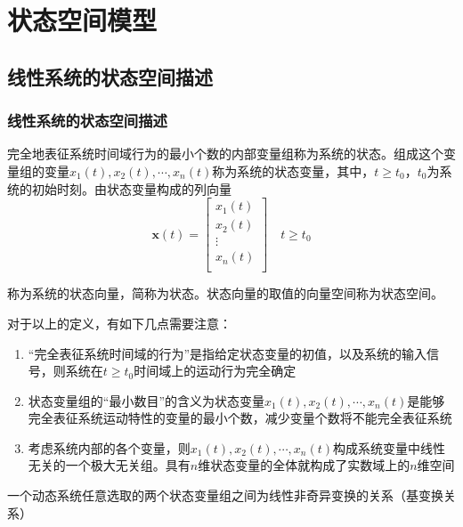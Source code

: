 \chapter{状态空间模型}

\section{线性系统的状态空间描述}

\subsection{线性系统的状态空间描述}

\begin{definition}[状态与状态空间]
    完全地表征系统时间域行为的最小个数的内部变量组称为系统的状态。组成这个变量组的变量$x_1(t),x_2(t),\cdots,x_n(t)$称为系统的状态变量，其中，$t \geq t_0$，$t_0$为系统的初始时刻。由状态变量构成的列向量
    \begin{equation*}
        \bm{x}(t) = \left[
            \begin{array}{c}
                x_1(t) \\ x_2(t) \\ \vdots \\ x_n(t)\\
            \end{array}
        \right] \quad t \geq t_0
    \end{equation*}

    称为系统的状态向量，简称为状态。状态向量的取值的向量空间称为状态空间。
\end{definition}

对于以上的定义，有如下几点需要注意：
\begin{enumerate}
    \item “完全表征系统时间域的行为”是指给定状态变量的初值，以及系统的输入信号，则系统在$t \geq t_0$时间域上的运动行为完全确定
    \item 状态变量组的“最小数目”的含义为状态变量$x_1(t),x_2(t),\cdots,x_n(t)$是能够完全表征系统运动特性的变量的最小个数，减少变量个数将不能完全表征系统
    \item 考虑系统内部的各个变量，则$x_1(t),x_2(t),\cdots,x_n(t)$构成系统变量中线性无关的一个极大无关组。具有$n$维状态变量的全体就构成了实数域上的$n$维空间
\end{enumerate}

\begin{corollary}
    一个动态系统任意选取的两个状态变量组之间为线性非奇异变换的关系（基变换关系）
\end{corollary}


